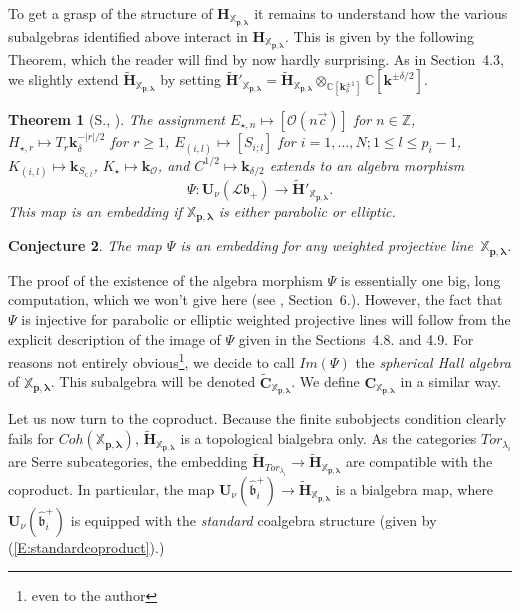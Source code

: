 \documentclass[a4paper,10pt]{amsart}
\def\Z{\mathbb{Z}}
\def\H{\mathbf{H}}
\def\U{\mathbf{U}}
\def\C{\mathbb{C}}
\def\O{\mathcal{O}}
\def\bo{\mathfrak{b}}
\def\xpl{\mathbb{X}_{\mathbf{p},\boldsymbol{\lambda}}}
\newtheorem{theo}{\bf{Theorem}}[section]
\newtheorem{conj}[theo]{Conjecture}
\numberwithin{equation}{section}
\begin{document}
{To get a grasp of the structure of $\H_{\xpl}$ it remains to understand how the various subalgebras identified above interact in $\H_{\xpl}$. This is given by the following Theorem, which the reader will find by now hardly surprising. As in Section~4.3, we slightly extend $\widetilde{\mathbf{H}}_{\xpl}$ by setting $\widetilde{\mathbf{H}}'_{\xpl}=\widetilde{\mathbf{H}}_{\xpl}\otimes_{\C[\mathbf{k}_{\delta}^{\pm 1}]} \C[\mathbf{k}^{\pm \delta/2}]$.

\vspace{.1in}

\begin{theo}[S., \cite{SDuke}]\label{T:SDuke} The assignment
$E_{\star,n}  \mapsto [\O(n\vec{c})]$ for $n \in \Z$,
$H_{\star,r} \mapsto T_r\mathbf{k}_{\delta}^{-|r|/2}$ for $r \geq 1$,
$E_{(i,l)} \mapsto [S_{i;l}]$ for $i=1, \ldots, N; 1 \leq l \leq p_i-1$,
$K_{(i,l)} \mapsto \mathbf{k}_{S_{i;l}}$,
$K_{\star} \mapsto \mathbf{k}_{\O}$, and
$C^{1/2} \mapsto \mathbf{k}_{\delta/2}$
extends to an algebra morphism
$$\Psi: \U_{\nu}(\mathcal{L}\bo_+) \to \widetilde{\H}'_{\xpl}.$$
 This map is an embedding if $\xpl$ is either parabolic or elliptic.
\end{theo}

\vspace{.05in}

\begin{conj} The map $\Psi$ is an embedding for any weighted projective line~$\xpl$.
\end{conj}

\vspace{.15in}

The proof of the existence of the algebra morphism $\Psi$ is essentially one big, long computation, which we won't give here (see \cite{SDuke}, Section~6.). However, the fact that $\Psi$ is injective for parabolic or elliptic weighted projective lines will follow from the explicit description of the image of $\Psi$ given in the Sections~4.8. and 4.9. For reasons not entirely obvious\footnote{even to the author}, we decide to call
$Im(\Psi)$ the \textit{spherical Hall algebra} of $\xpl$. This subalgebra will be denoted $\widetilde{\mathbf{C}}_{\xpl}$. We define $\mathbf{C}_{\xpl}$ in a similar way.

\vspace{.15in}

Let us now turn to the coproduct. Because the finite subobjects condition clearly fails for $Coh(\xpl)$, $\widetilde{\H}_{\xpl}$ is a topological bialgebra only. As the categories $Tor_{\lambda_i}$ are Serre subcategories, the embedding $\widetilde{\H}_{Tor_{\lambda_i}} \to \widetilde{\H}_{\xpl}$ are compatible with the coproduct. In particular, the map $\U_{\nu}(\widehat{\bo}_i^+) \to \widetilde{\H}_{\xpl}$ is a bialgebra map, where $\U_{\nu}(\widehat{\bo}_i^+)$ is equipped with the \textit{standard} coalgebra structure (given by
(\ref{E:standardcoproduct}).)

}
\end{document}
